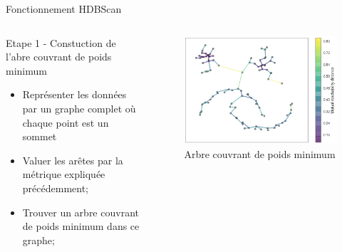 \begin{frame}{Fonctionnement HDBScan }
    \begin{columns}
        \begin{column}{0.55\textwidth}
            \begin{block}{Etape 1 - Constuction de l'abre couvrant de poids minimum}
                \begin{itemize}
                    \item Représenter les données par un graphe complet où chaque point est un sommet
                    \item Valuer les arêtes par la métrique expliquée précédemment;
                    \item Trouver un arbre couvrant de poids minimum dans ce graphe;
                \end{itemize}
            \end{block}
        \end{column}
        \begin{column}{0.45\textwidth}
            \begin{figure}
                \includegraphics[height=0.4\paperheight]{images/Illustration-HDBScan-2.png}
                \caption{\label{fig:ill_HDBScan_2} Arbre couvrant de poids minimum}
            \end{figure}
        \end{column}
    \end{columns}
\end{frame}

